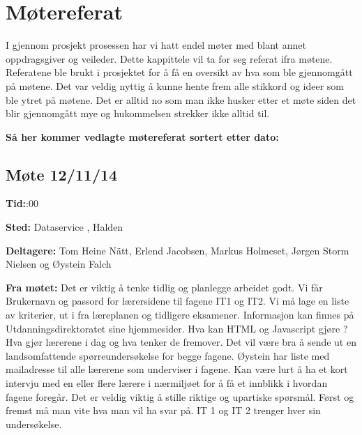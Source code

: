 \chapter{Møtereferat}

I gjennom prosjekt prosessen har vi hatt endel møter med blant annet oppdragsgiver og veileder. Dette kappittele vil ta for seg referat ifra møtene. Referatene ble brukt i prosjektet for å få en oversikt av hva som ble gjennomgått på møtene. Det var veldig nyttig å kunne hente frem alle stikkord og ideer som ble ytret på møtene. 
Det er alltid no som man ikke husker etter et møte siden det blir gjennomgått mye og hukommelsen strekker ikke alltid til.\newline
\vspace{30pt}


\hspace{-17pt}

\hspace{-17pt}\textbf{Så her kommer vedlagte møtereferat sortert etter dato:}

\newpage




\section{Møte 12/11/14}

\vspace{30pt}
\textbf{Tid:}:00\newline 

\hspace{-17pt}\textbf{Sted:}\newline 
Dataservice , Halden
\newline

\hspace{-17pt}\textbf{Deltagere:}\newline 
Tom Heine Nätt, Erlend Jacobsen, Markus Holmeset,\newline
Jørgen Storm Nielsen og Øystein Falch
\newline

\hspace{-17pt}\textbf{Fra møtet:}\newline
Det er viktig å tenke tidlig og planlegge arbeidet godt. Vi får Brukernavn og passord for lærersidene til fagene IT1 og IT2. Vi må lage en liste av kriterier, ut i fra læreplanen og tidligere eksamener. Informasjon kan finnes på Utdanningsdirektoratet sine hjemmesider.\newline
Hva kan HTML og Javascript gjøre ?\newline
Hva gjør lærerene i dag og hva tenker de fremover. Det vil være bra å sende ut en landsomfattende spørreundersøkelse for begge fagene. Øystein har liste med mailadresse til alle lærerene som underviser i fagene. Kan være lurt å ha et kort intervju med en eller flere lærere i nærmiljøet for å få et innblikk i hvordan fagene foregår.\newline
Det er veldig viktig å stille riktige og upartiske spørsmål. Først og fremst må man vite hva man vil ha svar på. IT 1 og IT 2 trenger hver sin undersøkelse.\newline

